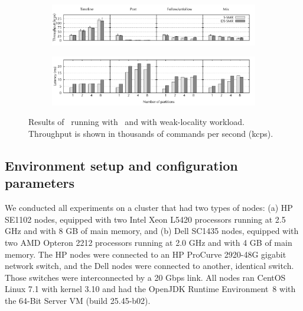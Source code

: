 
\begin{figure}[ht!]
\centering
\begin{subfigure}{1\columnwidth}
      \centering
      \includegraphics[width=\textwidth]{./figures/experiments/dssmr/dssmr-weak-locality-tp}
\end{subfigure}
\begin{subfigure}{1\columnwidth}
      \centering
      \includegraphics[width=\textwidth]{./figures/experiments/dssmr/dssmr-weak-locality-lat}
\end{subfigure}
\caption{Results of \dssmrappname\ running with \ssmr\ and \dssmr{} with weak-locality workload. Throughput is shown in thousands of commands per second (kcps).}
\label{fig:dssmr-weakloc}
\end{figure}

\subsection{Environment setup and configuration parameters}
\label{sec:dssmr-evaluation:setup}

We conducted all experiments on a cluster that had two types of nodes: (a) HP
SE1102 nodes, equipped with two Intel Xeon L5420 processors running at 2.5 GHz
and with 8 GB of main memory, and (b) Dell SC1435 nodes, equipped with two AMD
Opteron 2212 processors running at 2.0 GHz and with 4 GB of main memory. The HP
nodes were connected to an HP ProCurve 2920-48G gigabit network switch, and the
Dell nodes were connected to another, identical switch. Those switches were
interconnected by a 20 Gbps link. All nodes ran CentOS Linux 7.1 with kernel
3.10 and had the OpenJDK Runtime Environment~8 with the \mbox{64-Bit} Server VM
(build 25.45-b02).

